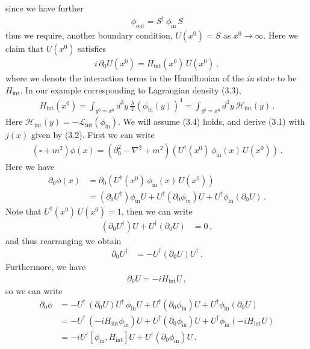\documentclass[11pt, onesided]{book}
\theoremstyle{break}
\theoremstyle{break}
\newcommand{\pd}{\partial}
\begin{document}
since we have further
\begin{align*}
\phi_{\text{out}} = S^\dagger\, \phi_{\text{in}}\, S
\end{align*}
thus we require, another boundary condition, $U(x^0) = S$ as $x^0\to \infty$. Here we claim that $U(x^0)$ satisfies 
\begin{align}
i\,\pd_0U(x^0) = H_{\text{int}}(x^0)\, U(x^0)\,,
\end{align}
where we denote the interaction terms in the Hamiltonian of the \textit{in} state to be $H_{\text{int}}$. In our example corresponding to Lagrangian density (3.3), 
\begin{align*}
H_{\text{int}}(x^0) = \int_{y^0 = x^0} d^3y\, \frac{\lambda}{4!}(\phi_{\text{in}}(y))^4 = \int_{y^0 = x^0}d^3y \, \mathcal{H}_{\text{int}}(y)\,.
\end{align*}
Here $\mathcal{H}_{\text{int}}(y) = -\mathcal{L}_{\text{int}}(\phi_{\text{in}})$. We will assume (3.4) holds, and derive (3.1) with $j(x)$ given by (3.2). First we can write
\begin{align*}
(\square + m^2) \phi(x) = (\pd_0^2 -\nabla^2 + m^2) \left( U^\dagger(x^0)\, \phi_{\text{in}}(x) \, U(x^0)\right)\,.
\end{align*}
Here we have
\begin{align*}
\pd_0\phi(x) 
&= \pd_0\left( U^\dagger(x^0) \, \phi_{\text{in}}(x) \, U(x^0)\right)\\
&= (\pd_0 U^\dagger) \phi_{\text{in}} U + U^\dagger (\pd_0 \phi_{\text{in}})U + U^\dagger\phi_{\text{in}}(\pd_0U)\,.
\end{align*}
Note that $U^\dagger(x^0)\, U(x^0) = 1$, then we can write
\begin{align*}
(\pd_0 U^\dagger) U + U^\dagger( \pd_0 U) &= 0\,,
\end{align*}
and thus rearranging we obtain
\begin{align*}
\pd_0 U^\dagger &= -U^\dagger (\pd_0 U) U^\dagger \,.
\end{align*}
Furthermore, we have
\begin{align*}
\pd_0 U  = -i H_{\text{int}}U\,,
\end{align*}
so we can write
\begin{align*}
\pd_0\phi &= -U^\dagger\, (\pd_0U)U^\dagger\, \phi_{\text{in}} U + U^\dagger (\pd_{0}\phi_{\text{in}}) U  + U^\dagger \phi_{\text{in}} (\pd_0 U)\\
&= -U^\dagger\, (-i H_{\text{int}}\phi_{\text{in}}) U + U^\dagger (\pd_{0}\phi_{\text{in}}) U  + U^\dagger \phi_{\text{in}} (-i H_{\text{int}} U )\\
&= -i U^\dagger[\phi_{\text{in}}, H_{\text{int}}]U + U^\dagger (\pd_0 \phi_{\text{in}})U\,.
\end{align*}
\end{document}

